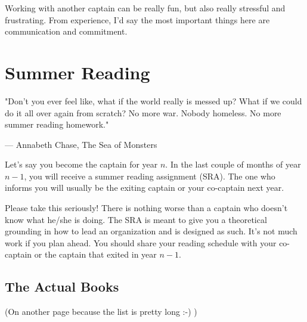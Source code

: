 \documentclass[11pt, letterpaper]{article}
\begin{document}
Working with another captain can be really fun, but also really stressful and frustrating.
From experience, I'd say the most important things here are communication and commitment.



\newpage

\section{Summer Reading}
\epigraph{"Don't you ever feel like, what if the world really is messed up? What if we could do it all over again from scratch? No more war. Nobody homeless. No more summer reading homework."}{--- \textup{Annabeth Chase}, The Sea of Monsters}

Let's say you become the captain for year $n$.
In the last couple of months of year $n-1$, you will receive a summer reading assignment (SRA).
The one who informs you will usually be the exiting captain or your co-captain next year.

Please take this seriously! 
There is nothing worse than a captain who doesn't know what he/she is doing.
The SRA is meant to give you a theoretical grounding in how to lead an organization and is designed as such.
It's not much work if you plan ahead.
You should share your reading schedule with your co-captain or the captain that exited in year $n-1$.

\newpage
\subsection{The Actual Books}
(On another page because the list is pretty long :-) )
\end{document}
